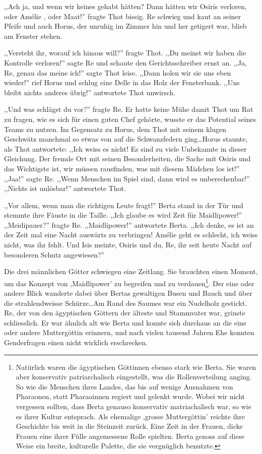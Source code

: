 \documentclass[11pt,titlepage,a5paper]{book}
\newcommand{\am}{Amélie }
\begin{document}
,,Ach ja, und wenn wir keines gehabt hätten? Dann hätten wir Osiris verloren, oder \am, oder Maat!'' fragte Thot bissig. Re schwieg und kaut an seiner Pfeife und auch Horus, der unruhig im Zimmer hin und her getigert war, blieb am Fenster stehen. 

,,Versteht ihr, worauf ich hinaus will?'' fragte Thot. ,,Du meinst wir haben die Kontrolle verloren!'' sagte Re und schaute den Gerichtsschreiber ernst an. ,,Ja, Re, genau das meine ich!'' sagte Thot leise. ,,Dann holen wir sie uns eben wieder!'' rief Horus und schlug eine Delle in das Holz der Fensterbank. ,,Uns bleibt nichts anderes übrig!'' antwortete Thot unwirsch. 

,,Und was schlägst du vor?'' fragte Re. Er hatte keine Mühe damit Thot um Rat zu fragen, wie es sich für einen guten Chef gehörte, wusste er das Potential seines Teams zu nutzen. Im Gegensatz zu Horus, dem Thot mit seinem klugen Geschwätz manchmal so etwas von auf die Schwanzfedern ging\dots Horus staunte, als Thot antwortete: ,,Ich weiss es nicht! Es sind zu viele Unbekannte in dieser Gleichung. Der fremde Ort mit seinen Besonderheiten, die Sache mit Osiris und das Wichtigste ist, wir müssen rausfinden, was mit diesem Mädchen los ist!'' ,,Jaa!'' sagte Re. ,,Wenn Menschen im Spiel sind, dann wird es unberechenbar!'' ,,Nichts ist unlösbar!'' antwortete Thot.

,,Vor allem, wenn man die richtigen Leute fragt!'' Berta stand in der Tür und stemmte ihre Fäuste in die Taille. ,,Ich glaube es wird Zeit für Maidlipower!'' ,,Meidipauer?'' fragte Re. ,,Maidlipower!'' antwortete Berta. ,,Ich denke, es ist an der Zeit mal eine Nacht auswärts zu verbringen! \am geht es schlecht, ich weiss nicht, was ihr fehlt. Und Isis meinte, Osiris und du, Re, ihr seit heute Nacht auf besonderen Schutz angewiesen?''

Die drei männlichen Götter schwiegen eine Zeitlang. Sie brauchten einen Moment, um das Konzept von ,Maidlipower' zu begreifen und zu verdauen\footnote{Natürlich waren die ägyptischen Göttinnen ebenso stark wie Berta. Sie waren aber konservativ patriarchalisch eingestellt, was die Rollenverteilung anging. So wie die Menschen ihres Landes, das bis auf wenige Ausnahmen von Pharaonen, statt Pharaoinnen regiert und gelenkt wurde. Wobei wir nicht vergessen sollten, dass Berta genauso konservativ matriachalisch war, so wie es ihrer Kultur entsprach. Als ehemalige ,grosse Muttergöttin' reichte ihre Geschichte bis weit in die Steinzeit zurück. Eine Zeit in der Frauen, dicke Frauen eine ihrer Fülle angemessene Rolle spielten. Berta genoss auf diese Weise ein breite, kulturelle Palette, die sie vergnüglich benutzte.}. Der eine oder andere Blick wanderte dabei über Bertas gewaltigen Busen und Bauch und über die strahlendweisse Schürze\dots Am Rand des Saumes war ein Nudelholz gestickt. Re, der von den ägyptischen Göttern der älteste und Stammvater war, grinste schliesslich. Er war ähnlich alt wie Berta und konnte sich durchaus an die eine oder andere Muttergöttin erinnern, und nach vielen tausend Jahren Ehe konnten Genderfragen einen nicht wirklich erschrecken.
\end{document}

